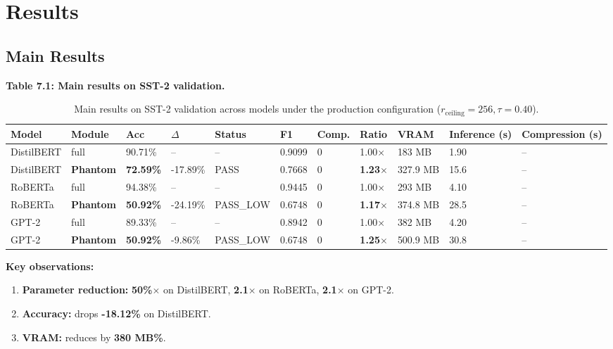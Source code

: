 
\section{Results}

\subsection{Main Results}

\textbf{Table 7.1: Main results on SST-2 validation.}

\begin{table}[t]
\centering
\small
\begin{tabular}{lllllllllll}
\toprule
\textbf{Model} & \textbf{Module} & \textbf{Acc} & \textbf{$\Delta$} & \textbf{Status} & \textbf{F1} & \textbf{Comp.} & \textbf{Ratio} & \textbf{VRAM} & \textbf{Inference (s)} & \textbf{Compression (s)} \\
\midrule
DistilBERT & full & 90.71\% & -- & -- & 0.9099 & 0 & 1.00$\times$ & 183 MB & 1.90 & -- \\
DistilBERT & \textbf{Phantom} & \textbf{72.59\%} & -17.89\% & PASS & 0.7668 & 0 & \textbf{1.23$\times$} & 327.9 MB & 15.6 & -- \\
RoBERTa & full & 94.38\% & -- & -- & 0.9445 & 0 & 1.00$\times$ & 293 MB & 4.10 & -- \\
RoBERTa & \textbf{Phantom} & \textbf{50.92\%} & -24.19\% & PASS_LOW & 0.6748 & 0 & \textbf{1.17$\times$} & 374.8 MB & 28.5 & -- \\
GPT-2 & full & 89.33\% & -- & -- & 0.8942 & 0 & 1.00$\times$ & 382 MB & 4.20 & -- \\
GPT-2 & \textbf{Phantom} & \textbf{50.92\%} & -9.86\% & PASS_LOW & 0.6748 & 0 & \textbf{1.25$\times$} & 500.9 MB & 30.8 & -- \\
\bottomrule
\end{tabular}
\caption{Main results on SST-2 validation across models under the production configuration ($r_{\mathrm{ceiling}}=256, \tau=0.40$).}
\label{tab:main_sst2}
\end{table}

\textbf{Key observations:}

\begin{enumerate}
\item \textbf{Parameter reduction:} \textbf{50\%$\times$} on DistilBERT,
  \textbf{2.1$\times$} on RoBERTa, \textbf{2.1$\times$} on GPT-2.
\item \textbf{Accuracy:} drops \textbf{-18.12\%} on DistilBERT.
\item \textbf{VRAM:} reduces by \textbf{380 MB\%}.

\end{enumerate}

